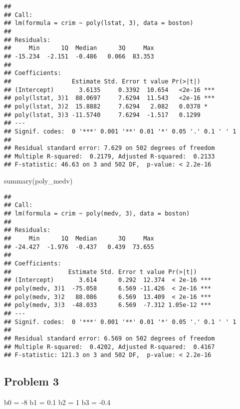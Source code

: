 \documentclass[
]{article}
\newenvironment{Shaded}{\begin{snugshade}}{\end{snugshade}}
\newcommand{\DecValTok}[1]{\textcolor[rgb]{0.00,0.00,0.81}{#1}}
\newcommand{\FloatTok}[1]{\textcolor[rgb]{0.00,0.00,0.81}{#1}}
\newcommand{\FunctionTok}[1]{\textcolor[rgb]{0.00,0.00,0.00}{#1}}
\newcommand{\NormalTok}[1]{#1}
\newcommand{\OtherTok}[1]{\textcolor[rgb]{0.56,0.35,0.01}{#1}}
\newcommand{\SpecialCharTok}[1]{\textcolor[rgb]{0.00,0.00,0.00}{#1}}
\begin{document}
\begin{verbatim}
## 
## Call:
## lm(formula = crim ~ poly(lstat, 3), data = boston)
## 
## Residuals:
##     Min      1Q  Median      3Q     Max 
## -15.234  -2.151  -0.486   0.066  83.353 
## 
## Coefficients:
##                 Estimate Std. Error t value Pr(>|t|)    
## (Intercept)       3.6135     0.3392  10.654   <2e-16 ***
## poly(lstat, 3)1  88.0697     7.6294  11.543   <2e-16 ***
## poly(lstat, 3)2  15.8882     7.6294   2.082   0.0378 *  
## poly(lstat, 3)3 -11.5740     7.6294  -1.517   0.1299    
## ---
## Signif. codes:  0 '***' 0.001 '**' 0.01 '*' 0.05 '.' 0.1 ' ' 1
## 
## Residual standard error: 7.629 on 502 degrees of freedom
## Multiple R-squared:  0.2179, Adjusted R-squared:  0.2133 
## F-statistic: 46.63 on 3 and 502 DF,  p-value: < 2.2e-16
\end{verbatim}

\begin{Shaded}
\begin{Highlighting}[]
\FunctionTok{summary}\NormalTok{(poly\_medv)}
\end{Highlighting}
\end{Shaded}

\begin{verbatim}
## 
## Call:
## lm(formula = crim ~ poly(medv, 3), data = boston)
## 
## Residuals:
##     Min      1Q  Median      3Q     Max 
## -24.427  -1.976  -0.437   0.439  73.655 
## 
## Coefficients:
##                Estimate Std. Error t value Pr(>|t|)    
## (Intercept)       3.614      0.292  12.374  < 2e-16 ***
## poly(medv, 3)1  -75.058      6.569 -11.426  < 2e-16 ***
## poly(medv, 3)2   88.086      6.569  13.409  < 2e-16 ***
## poly(medv, 3)3  -48.033      6.569  -7.312 1.05e-12 ***
## ---
## Signif. codes:  0 '***' 0.001 '**' 0.01 '*' 0.05 '.' 0.1 ' ' 1
## 
## Residual standard error: 6.569 on 502 degrees of freedom
## Multiple R-squared:  0.4202, Adjusted R-squared:  0.4167 
## F-statistic: 121.3 on 3 and 502 DF,  p-value: < 2.2e-16
\end{verbatim}

\hypertarget{problem-3}{%
\subsection{Problem 3}\label{problem-3}}

\begin{Shaded}
\begin{Highlighting}[]
\NormalTok{b0 }\OtherTok{=} \SpecialCharTok{{-}}\DecValTok{8}
\NormalTok{b1 }\OtherTok{=} \FloatTok{0.1}
\NormalTok{b2 }\OtherTok{=} \DecValTok{1}
\NormalTok{b3 }\OtherTok{=} \SpecialCharTok{{-}}\FloatTok{0.4}
\end{Highlighting}
\end{Shaded}
\end{document}
